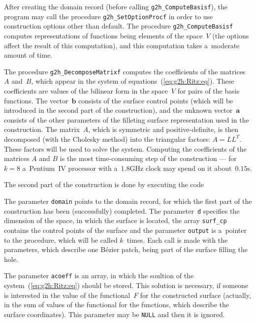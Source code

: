 After creating the domain record (before calling \texttt{g2h\_ComputeBasisf}),
the program may call the procedure \texttt{g2h\_SetOptionProcf} in order to use
construction options other than default. The procedure \texttt{g2h\_ComputeBasisf}
computes representations of functions being elements of the space~$V$ (the options
affect the result of this computation), and this computation takes a~moderate
amount of time.

The procedure \texttt{g2h\_DecomposeMatrixf} computes the coefficients of the
matrices $A$ and~$B$, which appear in the system of equations~(\ref{eq:g2h:Ritz:eq}).
These coefficients are values of the bilinear form in the space~$V$ for
pairs of the basis functions. The vector~$\bm{b}$ consists of the surface
control points (which will be introduced in the second part of the construction),
and the unknown vector~$\bm{a}$ consists of the other parameters of the
filleting surface representation used in the construction. The matrix~$A$,
which is symmetric and positive-definite, is then decomposed (with the Cholesky
method) into the triangular factors: $A=LL^T$. These factors will be used
to solve the system. Computing the coefficients of the matrices $A$ and $B$
is the most time-consuming step of the construction --- for $k=8$ a~Pentium~IV
processor with a~$1.8$GHz clock may spend on it about~$0.15$s.

\vspace{\medskipamount}
The second part of the construction is done by executing the code

\vspace{\medskipamount}

\vspace{\medskipamount}
The parameter \texttt{domain} points to the domain record, for which the first
part of the construction has been (successfully) completed. The
parameter~\texttt{d} specifies the dimension of the space, in which the
surface is located, the array \texttt{surf\_cp} contains the control points
of the surface and the parameter \texttt{output} is a~pointer to the
procedure, which will be called $k$~times. Each call is made with the
parameters, which describe one B\'{e}zier patch, being part of the
surface filling the hole.

The parameter \texttt{acoeff} is an array, in which the soultion of the
system~(\ref{eq:g2h:Ritz:eq}) should be stored. This solution is
necessary, if someone is interested in the value of the functional~$F$
for the constructed surface (actually, in the sum of values of the
functional for the functions, which describe the surface coordinates).
This parameter may be \texttt{NULL} and then it is ignored.


